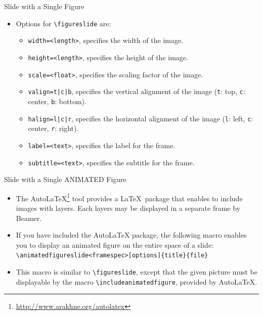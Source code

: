 \documentclass[english,sectioncirclenumberstyle]{ciadbeamer}
\begin{document}
\begin{frame}{Slide with a Single Figure \insertcontinuationtext}
	\begin{itemize}
	\item Options for \texttt{{\textbackslash}figureslide} are:
		\begin{itemize}
		\item \texttt{width=<length>}, specifies the width of the image.
		\vfill
		\item \texttt{height=<length>}, specifies the height of the image.
		\vfill
		\item \texttt{scale=<float>}, specifies the scaling factor of the image.
		\vfill
		\item \texttt{valign=t|c|b}, specifies the vertical alignment of the image (\texttt{t}: top, \texttt{c}: center, \texttt{b}: bottom).
		\vfill
		\item \texttt{halign=l|c|r}, specifies the horizontal alignment of the image (\texttt{l}: left, \texttt{c}: center, \texttt{r}: right).
		\vfill
		\item \texttt{label=<text>}, specifies the label for the frame.
		\vfill
		\item \texttt{subtitle=<text>}, specifies the subtitle for the frame.
		\end{itemize}
	\end{itemize}
\end{frame}


\begin{frame}{Slide with a Single ANIMATED Figure}
	\begin{itemize}
	\item The AutoLaTeX\footnote{\url{http://www.arakhne.org/autolatex}} tool provides a \LaTeX\ package that enables to include images with layers. Each layers may be displayed in a separate frame by Beamer.
	\vfill
	\item If you have included the AutoLaTeX package, the following macro enables you to display an animated figure on the entire space of a slide: \\
		\texttt{{\textbackslash}animatedfigureslide<framespec>[options]\{title\}\{file\}}
	\item This macro is similar to \texttt{{\textbackslash}figureslide}, except that the given picture must be displayable by the macro \texttt{{\textbackslash}includeanimatedfigure}, provided by AutoLaTeX.
	\end{itemize}
\end{frame}
\end{document}
